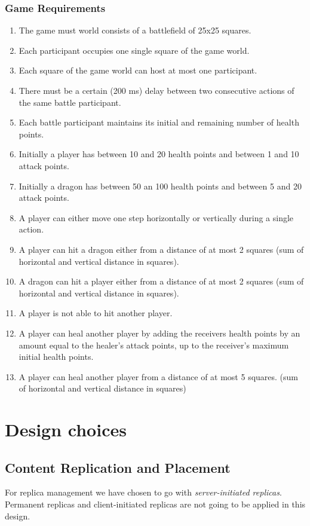 \documentclass{article}
\begin{document}
\subsubsection{Game Requirements}
\begin{enumerate}
	\item The game must world consists of a battlefield of 25x25 squares.
	\item Each participant occupies one single  square of the game world.
	\item Each square of the game world can host at most one participant.
	\item There must be a certain (200 ms) delay between two consecutive actions of the same battle participant.
	\item Each battle participant maintains its initial and remaining number of health points.
	\item Initially a player has between 10 and 20 health points and between 1 and 10 attack points.
	\item Initially a dragon has between 50 an 100 health points and between 5 and 20 attack points.
	\item A player can either move one step horizontally or vertically during a single action.
	\item A player can hit a dragon either from a distance of at most 2 squares (sum of horizontal and vertical distance in squares).
	\item A dragon can hit a player either from a distance of at most 2 squares (sum of horizontal and vertical distance in squares).
	\item A player is not able to hit another player.
	\item A player can heal another player by adding the receivers health points by an amount equal to the healer's attack points, up to the receiver's maximum initial health points. 
	\item A player can heal another player from a distance of at most 5 squares.  (sum of horizontal and vertical distance in squares)
\end{enumerate}

\section{Design choices}
\subsection{Content Replication and Placement}
For replica management we have chosen to go with \emph{server-initiated replicas}. Permanent replicas and client-initiated replicas are not going to be applied in this design. 
\end{document}
